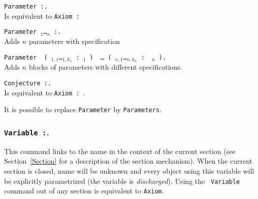 \begin{ErrMsgs}
\item {}
\end{ErrMsgs}

\begin{Variants} 
\item {\tt Parameter {\ident} :{\term}.} \\
  Is equivalent to {\tt Axiom {\ident} : {\term}}

\item {\tt Parameter {\ident$_1$}\ldots{\ident$_n$} {\tt :}{\term}.}\\
  Adds $n$ parameters with specification {\term}

\item
 {\tt Parameter\,%
(\,{\ident$_{1,1}$}\ldots{\ident$_{1,k_1}$}\,{\tt :}\,{\term$_1$} {\tt )}\,%
\ldots\,{\tt (}\,{\ident$_{n,1}$}\ldots{\ident$_{n,k_n}$}\,{\tt :}\,%
{\term$_n$} {\tt )}.}\\ 
  Adds $n$ blocks of parameters with different specifications.

\item {\tt Conjecture {\ident} :{\term}.}\\
  Is equivalent to {\tt Axiom {\ident} : {\term}}.
\end{Variants}

 It is possible to replace {\tt Parameter} by
{\tt Parameters}.


\subsubsection{{\tt Variable {\ident} :{\term}}.
}

This command links {\term} to the name {\ident} in the context of the
current section (see Section~\ref{Section} for a description of the section
mechanism). When the current section is closed, name {\ident} will be
unknown and every object using this variable will be explicitly
parametrized (the variable is {\em discharged}). Using the {\tt
Variable} command out of any section is equivalent to {\tt Axiom}.

\begin{ErrMsgs}
\item {}
\end{ErrMsgs}

